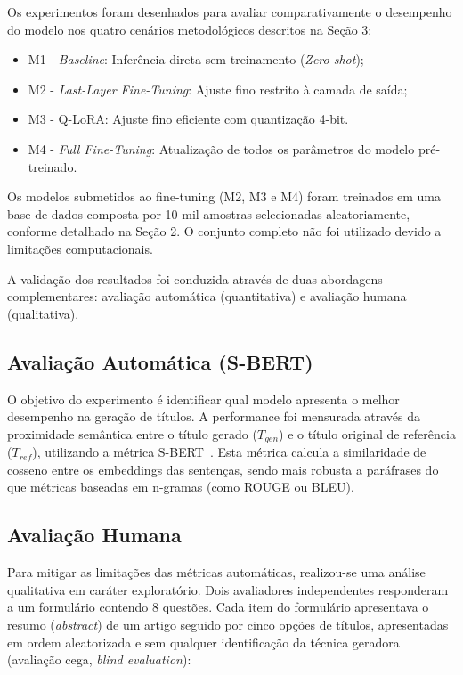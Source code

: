

Os experimentos foram desenhados para avaliar comparativamente o desempenho do modelo nos quatro cenários metodológicos descritos na Seção 3:

\begin{itemize}
    \item M1 - \textit{Baseline}: Inferência direta sem treinamento (\textit{Zero-shot});
    \item M2 - \textit{Last-Layer Fine-Tuning}: Ajuste fino restrito à camada de saída;
    \item M3 - Q-LoRA: Ajuste fino eficiente com quantização 4-bit.
    \item M4 - \textit{Full Fine-Tuning}: Atualização de todos os parâmetros do modelo pré-treinado.
\end{itemize}

Os modelos submetidos ao fine-tuning (M2, M3 e M4) foram treinados em uma base de dados composta por 10 mil amostras selecionadas aleatoriamente, conforme detalhado na Seção 2. O conjunto completo não foi utilizado devido a limitações computacionais.

A validação dos resultados foi conduzida através de duas abordagens complementares: avaliação automática (quantitativa) e avaliação humana (qualitativa).

\subsection{Avaliação Automática (S-BERT)}

O objetivo do experimento é identificar qual modelo apresenta o melhor desempenho na geração de títulos. A performance foi mensurada através da proximidade semântica entre o título gerado ($T_{gen}$) e o título original de referência ($T_{ref}$), utilizando a métrica S-BERT~\cite{reimers_sentence-bert_2019,zhang_semantics-aware_2020}.
Esta métrica calcula a similaridade de cosseno entre os embeddings das sentenças, sendo mais robusta a paráfrases do que métricas baseadas em n-gramas (como ROUGE ou BLEU).

\subsection{Avaliação Humana}

Para mitigar as limitações das métricas automáticas, realizou-se uma análise qualitativa em caráter exploratório. Dois avaliadores independentes responderam a um formulário contendo $8$ questões.
Cada item do formulário apresentava o resumo (\textit{abstract}) de um artigo seguido por cinco opções de títulos, apresentadas em ordem aleatorizada e sem qualquer identificação da técnica geradora (avaliação cega, \textit{blind evaluation}):


